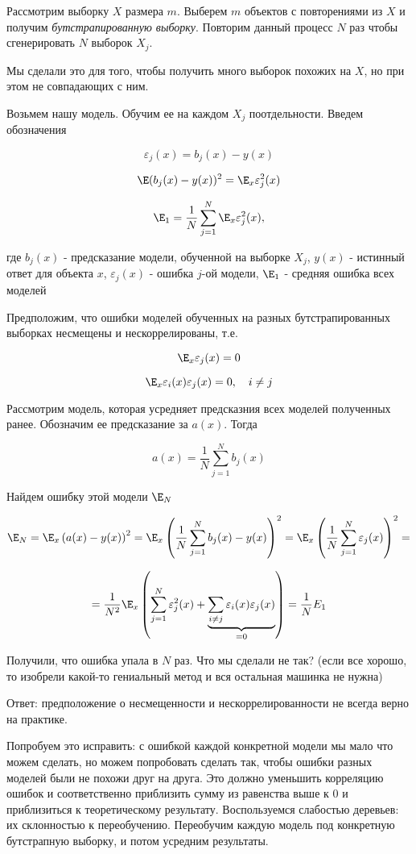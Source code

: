 Рассмотрим выборку $X$ размера $m$. Выберем $m$ объектов с повторениями из $X$ и получим \textit{бутстрапированную выборку}. Повторим данный процесс $N$ раз чтобы сгенерировать $N$ выборок $X_j$.

Мы сделали это для того, чтобы получить много выборок похожих на $X$, но при этом не совпадающих с ним. 

Возьмем нашу модель. Обучим ее на каждом $X_j$ поотдельности. Введем обозначения

\[ \varepsilon_j(x) = b_j(x)-y(x)\]

\[ \E (b_j(x) - y(x))^2=\E_x \varepsilon_j^2(x)\]

\[ \E_1 = \frac 1 N \sum_{j=1}^N \E_x \varepsilon_j^2(x),\]

где $b_j(x)$ - предсказание модели, обученной на выборке $X_j$, $y(x)$ - истинный ответ для объекта $x$, $\varepsilon_j(x)$ - ошибка $j$-ой модели, $\E_1$ - средняя ошибка всех моделей

Предположим, что ошибки моделей обученных на разных бутстрапированных выборках несмещены и нескоррелированы, т.е.

\[ \E_x \varepsilon_j(x) = 0\]

\[ \E_x \varepsilon_i(x) \varepsilon_j(x)=0, \quad i \neq j\]

Рассмотрим модель, которая усредняет предсказния всех моделей полученных ранее. Обозначим ее предсказание за $a(x)$. Тогда

\[ a(x)=\frac 1 N \sum_{j=1}^N b_j(x)\]

Найдем ошибку этой модели $\E_N$

\[ \E_N = \E_x \left( a(x) - y(x)\right)^2=\E_x \left( \frac 1 N \sum_{j=1}^N b_j(x) - y(x)\right)^2 = \E_x \left(\frac 1 N \sum_{j=1}^N \varepsilon_j(x) \right)^2= \] 

\[ = \frac{1}{N^2} \E_x \left( \sum_{j=1}^N \varepsilon_j^2(x) + \underbrace{\sum_{i \neq j} \varepsilon_i(x) \varepsilon_j(x)}_{=0} \right) = \frac 1 N E_1 \]

Получили, что ошибка упала в $N$ раз. Что мы сделали не так? (если все хорошо, то изобрели какой-то гениальный метод и вся остальная машинка не нужна)

Ответ: предположение о несмещенности и нескоррелированности не всегда верно на практике. 

Попробуем это исправить: с ошибкой каждой конкретной модели мы мало что можем сделать, но можем попробовать сделать так, чтобы ошибки разных моделей были не похожи друг на друга. Это должно уменьшить корреляцию ошибок и соответственно приблизить сумму из равенства выше к 0 и приблизиться к теоретическому результату. Воспользуемся слабостью деревьев: их склонностью к переобучению. Переобучим каждую модель под конкретную бутстрапную выборку, и потом усредним результаты. 

